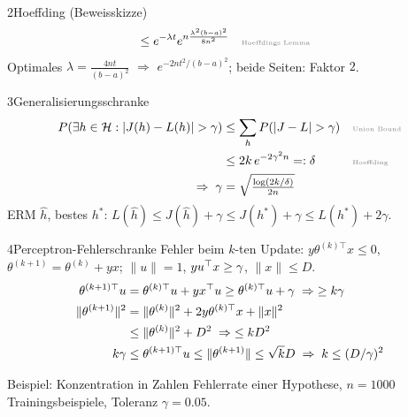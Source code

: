 \begin{hngrid}
\begin{hnp}[raster multicolumn=3,acc=hnteal]{2}{Hoeffding (Beweisskizze)}
\begin{align*}
&\le e^{-\lambda t}e^{n\frac{\lambda^2(b-a)^2}{8n^2}}&&\why{Hoeffdings Lemma}
\end{align*}
Optimales $\lambda=\frac{4nt}{(b-a)^2}$ $\Rightarrow$ $e^{-2nt^2/(b-a)^2}$; beide Seiten: Faktor $2$.
\end{hnp}
%
\begin{hnp}[raster multicolumn=3,acc=hngreen]{3}{Generalisierungsschranke}
\begin{align*}
P(\exists h\in\mathcal H:|J(h)-L(h)|>\gamma)&\le\sum_hP(|J-L|>\gamma)&&\why{Union Bound}\\
&\le2k\,e^{-2\gamma^2n}=:\delta&&\why{Hoeffding}\\
\Rightarrow\;\gamma&=\sqrt{\tfrac{\log(2k/\delta)}{2n}}
\end{align*}
ERM $\hat h$, bestes $h^*$: $L(\hat h)\le J(\hat h)+\gamma\le J(h^*)+\gamma\le L(h^*)+2\gamma$.
\end{hnp}
%
\begin{hnp}[raster multicolumn=3,acc=hnrose]{4}{Perceptron-Fehlerschranke}
Fehler beim $k$-ten Update: $y\theta^{(k)\top}x\le0$, $\theta^{(k+1)}=\theta^{(k)}+yx$; $\|u\|=1$, $yu^{\top} x\ge\gamma$, $\|x\|\le D$.
\begin{align*}
\theta^{(k+1)\top}u&=\theta^{(k)\top}u+yx^{\top} u\ge\theta^{(k)\top}u+\gamma\;\Rightarrow\;\ge k\gamma\\
\|\theta^{(k+1)}\|^2&=\|\theta^{(k)}\|^2+2y\theta^{(k)\top}x+\|x\|^2\\&\le\|\theta^{(k)}\|^2+D^2\;\Rightarrow\;\le kD^2\\
k\gamma&\le\theta^{(k+1)\top}u\le\|\theta^{(k+1)}\|\le\sqrt kD\;\Rightarrow\;k\le(D/\gamma)^2
\end{align*}
\end{hnp}
%
\begin{hnex}[raster multicolumn=3]{Beispiel: Konzentration in Zahlen}
Fehlerrate einer Hypothese, $n=1000$ Trainingsbeispiele, Toleranz $\gamma=0.05$.\\

\end{hnex}
\end{hngrid}
